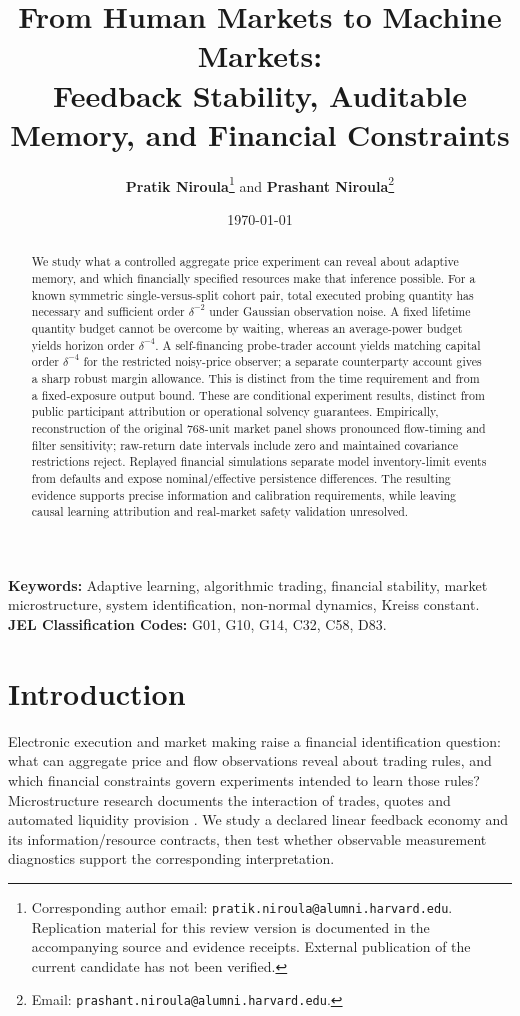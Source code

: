 \documentclass[12pt]{article}
\title{\textbf{From Human Markets to Machine Markets:}\\[0.3em]
\Large Feedback Stability, Auditable Memory, and Financial Constraints}
\author{\textbf{Pratik Niroula}\thanks{Corresponding author email: \texttt{pratik.niroula@alumni.harvard.edu}. Replication material for this review version is documented in the accompanying source and evidence receipts. External publication of the current candidate has not been verified.} \quad and \quad \textbf{Prashant Niroula}\thanks{Email: \texttt{prashant.niroula@alumni.harvard.edu}.}}
\date{\today}
\theoremstyle{definition}
\theoremstyle{remark}
\begin{document}
\maketitle
\thispagestyle{empty}

\vspace{-0.5em}
\begin{abstract}
\noindent We study what a controlled aggregate price experiment can reveal about adaptive memory, and which financially specified resources make that inference possible. For a known symmetric single-versus-split cohort pair, total executed probing quantity has necessary and sufficient order $\delta^{-2}$ under Gaussian observation noise. A fixed lifetime quantity budget cannot be overcome by waiting, whereas an average-power budget yields horizon order $\delta^{-4}$. A self-financing probe-trader account yields matching capital order $\delta^{-4}$ for the restricted noisy-price observer; a separate counterparty account gives a sharp robust margin allowance. This is distinct from the time requirement and from a fixed-exposure output bound. These are conditional experiment results, distinct from public participant attribution or operational solvency guarantees. Empirically, reconstruction of the original 768-unit market panel shows pronounced flow-timing and filter sensitivity; raw-return date intervals include zero and maintained covariance restrictions reject. Replayed financial simulations separate model inventory-limit events from defaults and expose nominal/effective persistence differences. The resulting evidence supports precise information and calibration requirements, while leaving causal learning attribution and real-market safety validation unresolved.


\end{abstract}

\vspace{1.0em}
\noindent\textbf{Keywords:} Adaptive learning, algorithmic trading, financial stability, market microstructure, system identification, non-normal dynamics, Kreiss constant.\\
\textbf{JEL Classification Codes:} G01, G10, G14, C32, C58, D83.

\newpage
\setcounter{page}{1}

\section{Introduction}
\label{sec:intro}

Electronic execution and market making raise a financial identification question: what can aggregate price and flow observations reveal about trading rules, and which financial constraints govern experiments intended to learn those rules? Microstructure research documents the interaction of trades, quotes and automated liquidity provision \citep{hasbrouck1991,menkveld2013,budish2015}. We study a declared linear feedback economy and its information/resource contracts, then test whether observable measurement diagnostics support the corresponding interpretation.
\end{document}
